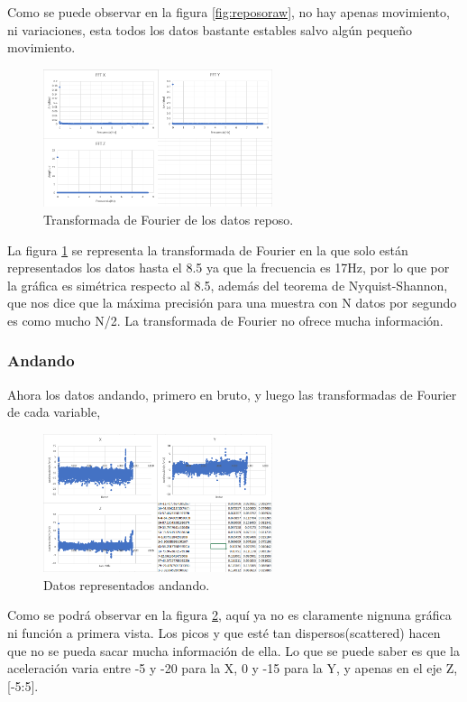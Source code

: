 \documentclass[12pt]{article}
\numberwithin{equation}{section}
\begin{document}
{Como se puede observar en la figura \ref{fig:reposoraw}, no hay apenas movimiento, ni variaciones, esta todos los datos bastante estables salvo algún pequeño movimiento.

\begin{figure}[h]
    \centering
    \includegraphics[width=0.6\textwidth]{reposofft.png}
    \caption{Transformada de Fourier de los datos reposo.}
    \label{fig:reposofft}
\end{figure}

La figura \ref{fig:reposofft} se representa la transformada de Fourier en la que solo están representados los datos hasta el 8.5 ya que la frecuencia es 17Hz, por lo que por la gráfica es simétrica respecto al 8.5, además del teorema de Nyquist-Shannon, que nos dice que la máxima precisión para una muestra con N datos por segundo es como mucho N/2. La transformada de Fourier no ofrece mucha información.
\subsubsection{Andando}

Ahora los datos andando, primero en bruto, y luego las transformadas de Fourier de cada variable,
\begin{figure}[h]
    \centering
    \includegraphics[width=0.6\textwidth]{andandoraw.png}
    \caption{Datos representados andando.}
    \label{fig:andandoraw}
\end{figure}

Como se podrá observar en la figura \ref{fig:andandoraw}, aquí ya no es claramente nignuna gráfica ni función a primera vista. Los picos y que esté tan dispersos(scattered) hacen que no se pueda sacar mucha información de ella. Lo que se puede saber es que la aceleración varia entre -5 y -20 para la X, 0 y -15 para la Y, y apenas en el eje Z, [-5:5].

}
\end{document}
